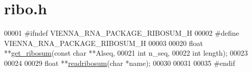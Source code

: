 \hypertarget{ribo_8h_source}{}\section{ribo.\+h}
\label{ribo_8h_source}

\begin{DoxyCode}
00001 \textcolor{preprocessor}{#ifndef VIENNA\_RNA\_PACKAGE\_RIBOSUM\_H}
00002 \textcolor{preprocessor}{#define VIENNA\_RNA\_PACKAGE\_RIBOSUM\_H}
00003 
00020 \textcolor{keywordtype}{float} **\hyperlink{group__consensus__fold_ga1116aed4b2dab5252cd23946d47d52c3}{get\_ribosum}(\textcolor{keyword}{const} \textcolor{keywordtype}{char}  **Alseq,
00021                     \textcolor{keywordtype}{int}         n\_seq,
00022                     \textcolor{keywordtype}{int}         length);
00023 
00024 
00029 \textcolor{keywordtype}{float} **\hyperlink{group__file__utils_ga5e125c9586fcd4e2e1559fe76f7289cc}{readribosum}(\textcolor{keywordtype}{char} *name);
00030 
00031 
00035 \textcolor{preprocessor}{#endif}
\end{DoxyCode}
